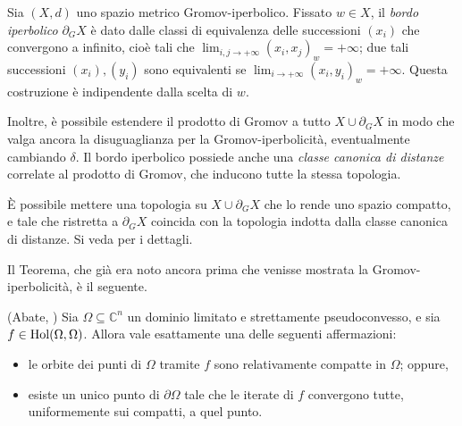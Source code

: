\begin{defn}
    Sia $(X,d)$ uno spazio metrico Gromov-iperbolico. Fissato $w \in X$, il \textit{bordo iperbolico} $\partial_GX$ è dato dalle classi di equivalenza delle successioni $(x_i)$ che convergono a infinito, cioè tali che $\displaystyle\lim_{i,j\rightarrow+\infty}(x_i,x_j)_w=+\infty$; due tali successioni $(x_i), (y_i)$ sono equivalenti se $\displaystyle\lim_{i\rightarrow+\infty}(x_i,y_i)_w=+\infty$. Questa costruzione è indipendente dalla scelta di $w$.

    Inoltre, è possibile estendere il prodotto di Gromov a tutto $X\cup\partial_GX$ in modo che valga ancora la disuguaglianza per la Gromov-iperbolicità, eventualmente cambiando $\delta$. Il bordo iperbolico possiede anche una \textit{classe canonica di distanze} correlate al prodotto di Gromov, che inducono tutte la stessa topologia.
\end{defn}

\begin{oss}
    È possibile mettere una topologia su $X\cup\partial_GX$ che lo rende uno spazio compatto, e tale che ristretta a $\partial_GX$ coincida con la topologia indotta dalla classe canonica di distanze. Si veda \cite[Part III, Chapter H, Paragraph 3]{BH} per i dettagli.
\end{oss}

Il Teorema, che già era noto ancora prima che venisse mostrata la Gromov-iperbolicità, è il seguente.

\begin{thm} \label{abate_wd}
    (Abate, \cite[Theorem 0.5]{A2}) Sia $\Omega \subseteq \mathbb{C}^n$ un dominio limitato e strettamente pseudoconvesso, e sia $f \in \textnormal{Hol}(\Omega,\Omega)$. Allora vale esattamente una delle seguenti affermazioni:
    \begin{itemize}
        \item le orbite dei punti di $\Omega$ tramite $f$ sono relativamente compatte in $\Omega$; oppure,
        \item esiste un unico punto di $\partial\Omega$ tale che le iterate di $f$ convergono tutte, uniformemente sui compatti, a quel punto.
    \end{itemize}
\end{thm}


